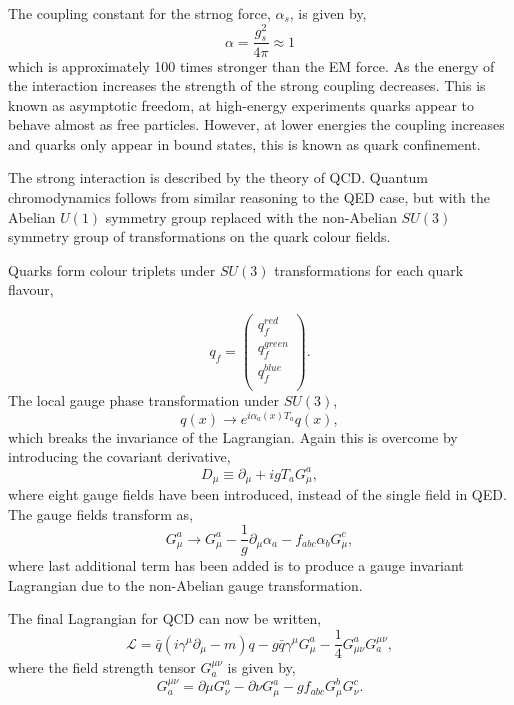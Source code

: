 The coupling constant for the strnog force, $\alpha_s$, is given by,
\begin{equation}
\alpha = \frac{g_s^2}{4 \pi} \approx 1
\end{equation}
which is approximately 100 times stronger than the \ac{EM} force.
As the energy of the interaction increases the strength of the strong coupling
decreases. This is known as asymptotic freedom, at high-energy experiments
quarks appear to behave almost as free particles. However, at lower energies 
the coupling increases and quarks only appear in bound states, this is known as
quark confinement.

The strong interaction is described by the theory of \ac{QCD}.
Quantum chromodynamics follows from similar reasoning to the \ac{QED} case, but with
the Abelian $U(1)$ symmetry group replaced with the non-Abelian $SU(3)$ symmetry
group of transformations on the quark colour fields.

Quarks form colour triplets under $SU(3)$ transformations for each quark
flavour,

\begin{equation}
q_{f} =
\left(\begin{matrix} 
q^{red}_{f} \\
q^{green}_{f} \\
q^{blue}_{f} \\
\end{matrix} \right).
\end{equation}
The local gauge phase transformation under $SU(3)$,
\begin{equation}
q(x) \to e^{i\alpha_a(x)T_a} q(x),
\end{equation}
which breaks the invariance of the Lagrangian. Again this is overcome by
introducing the covariant derivative,
\begin{equation}
D_{\mu} \equiv \partial_{\mu} + i g T_{a} G_{\mu}^{a},
\end{equation}
where eight gauge fields have been introduced, instead of the single field in
QED.  
The gauge fields transform as,
\begin{equation}
 G_{\mu}^{a} \to G_{\mu}^{a} 
-\frac{1}{g}\partial_{\mu}\alpha_{a}
-f_{abc}\alpha_{b}G^{c}_{\mu},
\end{equation}
where last additional term has been added is to produce a gauge invariant
Lagrangian due to the non-Abelian gauge transformation.

The final Lagrangian for QCD can now be written,
\begin{equation}
\mathcal{L} = 
\bar{q}(i\gamma^{\mu}\partial_{\mu} - m)q -
g \bar{q} \gamma^{\mu} G_{\mu}^{a} - 
\frac{1}{4} G_{\mu\nu}^{a} G^{\mu\nu}_{a},
\end{equation}
where the field strength tensor $G^{\mu\nu}_{a}$ is given by,
\begin{equation}
G^{\mu\nu}_{a} 
= \partial{\mu} G^{a}_{\nu}
- \partial{\nu} G^{a}_{\mu}
-g f_{abc} G^{b}_{\mu} G^{c}_{\nu}.
\end{equation}

